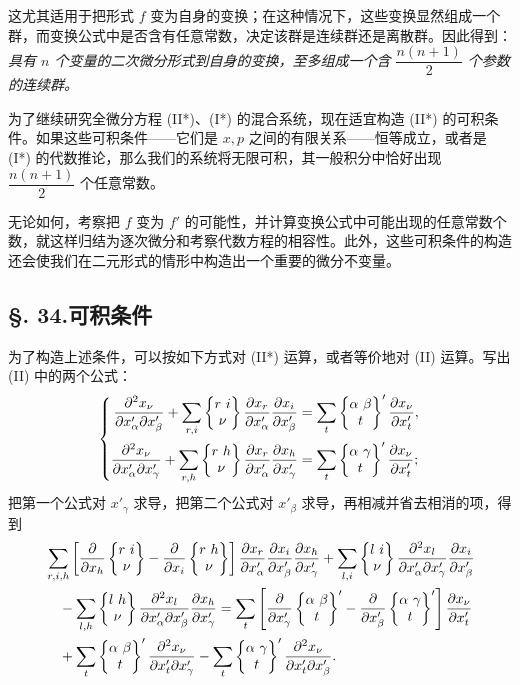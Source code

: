 这尤其适用于把形式 $f$ 变为自身的变换；在这种情况下，这些变换显然组成一个群，而变换公式中是否含有任意常数，决定该群是连续群还是离散群。因此得到：
\emph{具有 $n$ 个变量的二次微分形式到自身的变换，至多组成一个含 $\dfrac{n(n+1)}{2}$ 个参数的连续群。}

为了继续研究全微分方程 (II*)、(I*) 的混合系统，现在适宜构造 (II*) 的可积条件。如果这些可积条件——它们是 \(x,p\) 之间的有限关系——恒等成立，或者是 (I*) 的代数推论，那么我们的系统将无限可积，其一般积分中恰好出现 $\dfrac{n(n+1)}{2}$ 个任意常数。

无论如何，考察把 $f$ 变为 $f'$ 的可能性，并计算变换公式中可能出现的任意常数个数，就这样归结为逐次微分和考察代数方程的相容性。此外，这些可积条件的构造还会使我们在二元形式的情形中构造出一个重要的微分不变量。

\subsection*{\S. 34.\quad 可积条件}
为了构造上述条件，可以按如下方式对 (II*) 运算，或者等价地对 (II) 运算。写出 (II) 中的两个公式：
\[
\left\{
\begin{aligned}
\frac{\partial^2x_\nu}{\partial x'_\alpha\partial x'_\beta}
+\sum_{r,i}\left\{\begin{matrix}r\ i\\ \nu\end{matrix}\right\}\frac{\partial x_r}{\partial x'_\alpha}\frac{\partial x_i}{\partial x'_\beta}
&=\sum_t\left\{\begin{matrix}\alpha\ \beta\\ t\end{matrix}\right\}'\frac{\partial x_\nu}{\partial x'_t},\\
\frac{\partial^2x_\nu}{\partial x'_\alpha\partial x'_\gamma}
+\sum_{r,h}\left\{\begin{matrix}r\ h\\ \nu\end{matrix}\right\}\frac{\partial x_r}{\partial x'_\alpha}\frac{\partial x_h}{\partial x'_\gamma}
&=\sum_t\left\{\begin{matrix}\alpha\ \gamma\\ t\end{matrix}\right\}'\frac{\partial x_\nu}{\partial x'_t};
\end{aligned}
\right.
\]
把第一个公式对 $x'_\gamma$ 求导，把第二个公式对 $x'_\beta$ 求导，再相减并省去相消的项，得到
\[
\begin{aligned}
&\sum_{r,i,h}\left[\frac{\partial}{\partial x_h}\left\{\begin{matrix}r\ i\\ \nu\end{matrix}\right\}-\frac{\partial}{\partial x_i}\left\{\begin{matrix}r\ h\\ \nu\end{matrix}\right\}\right]
\frac{\partial x_r}{\partial x'_\alpha}\frac{\partial x_i}{\partial x'_\beta}\frac{\partial x_h}{\partial x'_\gamma}
+\sum_{l,i}\left\{\begin{matrix}l\ i\\ \nu\end{matrix}\right\}\frac{\partial^2x_l}{\partial x'_\alpha\partial x'_\gamma}\frac{\partial x_i}{\partial x'_\beta}\\
&\quad -\sum_{l,h}\left\{\begin{matrix}l\ h\\ \nu\end{matrix}\right\}\frac{\partial^2x_l}{\partial x'_\alpha\partial x'_\beta}\frac{\partial x_h}{\partial x'_\gamma}
=\sum_t\left[\frac{\partial}{\partial x'_\gamma}\left\{\begin{matrix}\alpha\ \beta\\ t\end{matrix}\right\}'-\frac{\partial}{\partial x'_\beta}\left\{\begin{matrix}\alpha\ \gamma\\ t\end{matrix}\right\}'\right]\frac{\partial x_\nu}{\partial x'_t}\\
&\quad +\sum_t\left\{\begin{matrix}\alpha\ \beta\\ t\end{matrix}\right\}'\frac{\partial^2x_\nu}{\partial x'_t\partial x'_\gamma}
-\sum_t\left\{\begin{matrix}\alpha\ \gamma\\ t\end{matrix}\right\}'\frac{\partial^2x_\nu}{\partial x'_t\partial x'_\beta}.
\end{aligned}
\]
